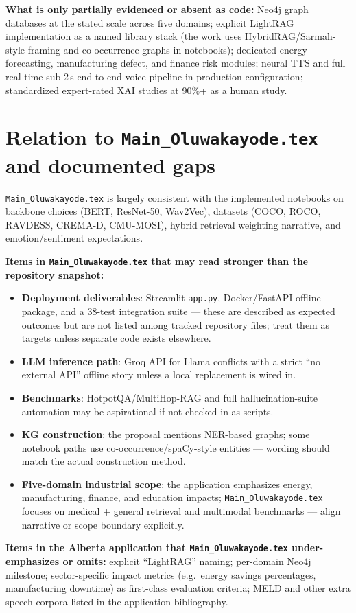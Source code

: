 \documentclass[11pt,a4paper]{article}
\begin{document}
\textbf{What is only partially evidenced or absent as code:} Neo4j graph databases at the stated scale across five domains; explicit LightRAG implementation as a named library stack (the work uses HybridRAG/Sarmah-style framing and co-occurrence graphs in notebooks); dedicated energy forecasting, manufacturing defect, and finance risk modules; neural TTS and full real-time sub-2\,s end-to-end voice pipeline in production configuration; standardized expert-rated XAI studies at 90\%+ as a human study.

\section{Relation to \texttt{Main\_Oluwakayode.tex} and documented gaps}
\texttt{Main\_Oluwakayode.tex} is largely consistent with the implemented notebooks on backbone choices (BERT, ResNet-50, Wav2Vec), datasets (COCO, ROCO, RAVDESS, CREMA-D, CMU-MOSI), hybrid retrieval weighting narrative, and emotion/sentiment expectations.

\textbf{Items in \texttt{Main\_Oluwakayode.tex} that may read stronger than the repository snapshot:}
\begin{itemize}[leftmargin=1.5em]
  \item \textbf{Deployment deliverables}: Streamlit \texttt{app.py}, Docker/FastAPI offline package, and a 38-test integration suite --- these are described as expected outcomes but are not listed among tracked repository files; treat them as targets unless separate code exists elsewhere.
  \item \textbf{LLM inference path}: Groq API for Llama conflicts with a strict ``no external API'' offline story unless a local replacement is wired in.
  \item \textbf{Benchmarks}: HotpotQA/MultiHop-RAG and full hallucination-suite automation may be aspirational if not checked in as scripts.
  \item \textbf{KG construction}: the proposal mentions NER-based graphs; some notebook paths use co-occurrence/spaCy-style entities --- wording should match the actual construction method.
  \item \textbf{Five-domain industrial scope}: the application emphasizes energy, manufacturing, finance, and education impacts; \texttt{Main\_Oluwakayode.tex} focuses on medical + general retrieval and multimodal benchmarks --- align narrative or scope boundary explicitly.
\end{itemize}

\textbf{Items in the Alberta application that \texttt{Main\_Oluwakayode.tex} under-emphasizes or omits:} explicit ``LightRAG'' naming; per-domain Neo4j milestone; sector-specific impact metrics (e.g.\ energy savings percentages, manufacturing downtime) as first-class evaluation criteria; MELD and other extra speech corpora listed in the application bibliography.
\end{document}
